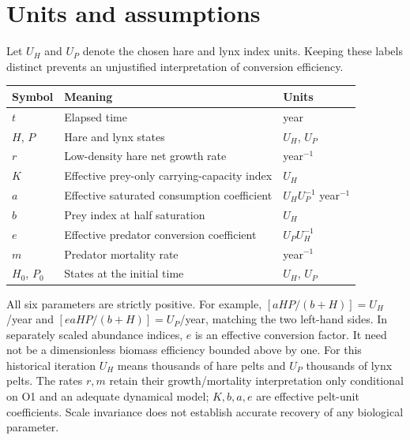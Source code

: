 \section{Units and assumptions}
Let $U_H$ and $U_P$ denote the chosen hare and lynx index units. Keeping these labels
distinct prevents an unjustified interpretation of conversion efficiency.
\begin{center}
\small
\begin{tabularx}{\linewidth}{@{}lXl@{}}
\toprule
Symbol & Meaning & Units\\\midrule
$t$ & Elapsed time & year\\
$H$, $P$ & Hare and lynx states & $U_H$, $U_P$\\
$r$ & Low-density hare net growth rate & year$^{-1}$\\
$K$ & Effective prey-only carrying-capacity index & $U_H$\\
$a$ & Effective saturated consumption coefficient & $U_H U_P^{-1}$ year$^{-1}$\\
$b$ & Prey index at half saturation & $U_H$\\
$e$ & Effective predator conversion coefficient & $U_P U_H^{-1}$\\
$m$ & Predator mortality rate & year$^{-1}$\\
$H_0$, $P_0$ & States at the initial time & $U_H$, $U_P$\\
\bottomrule
\end{tabularx}
\end{center}
All six parameters are strictly positive. For example,
$[aHP/(b+H)]=U_H$/year and $[eaHP/(b+H)]=U_P$/year, matching the two left-hand
sides. In separately scaled abundance indices, $e$ is an effective conversion
factor. It need not be a dimensionless biomass efficiency bounded above by one.
For this historical iteration $U_H$ means thousands of hare pelts and $U_P$
thousands of lynx pelts. The rates $r,m$ retain their growth/mortality interpretation
only conditional on O1 and an adequate dynamical model; $K,b,a,e$ are effective
pelt-unit coefficients. Scale invariance does not establish accurate recovery of
any biological parameter.

